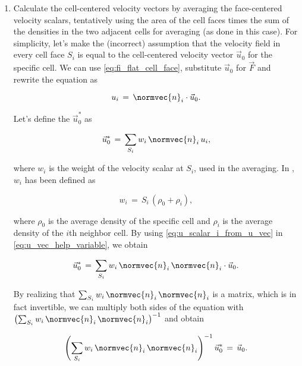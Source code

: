 \begin{enumerate}
    \item Calculate the cell-centered velocity vectors by averaging the face-centered velocity scalars, tentatively using the area of the cell faces times the sum of the densities in the two adjacent cells for averaging (as done in this case). For simplicity, let's make the (incorrect) assumption that the velocity field in every cell face $S_i$ is equal to the cell-centered velocity vector $\vec{u}_0$ for the specific cell. We can use \eqref{eq:fi_flat_cell_face}, substitute $\vec{u}_0$ for $\vec{F}$ and rewrite the equation as
    
    \begin{equation} \label{eq:u_scalar_i_from_u_vec}
    u_i \,=\, \normvec{n}_i\cdot\vec{u}_0.
    \end{equation}
    
    Let's define the  $\vec{u}_0^*$ as
    
    \begin{equation} \label{eq:u_vec_help_variable}
    \vec{u}_0^* \,=\, \sum_{S_i}w_i\,\normvec{n}_i\,u_i,
    \end{equation}
    
    where $w_i$ is the weight of the velocity scalar at $S_i$, used in the averaging. In \thisprojectwork, $w_i$ has been defined as
    
    \begin{equation}
    w_i \,=\, S_i\,(\rho_0 + \rho_i),
    \end{equation}
    
    where $\rho_0$ is the average density of the specific cell and $\rho_i$ is the average density of the $i$th neighbor cell. By using \eqref{eq:u_scalar_i_from_u_vec} in \eqref{eq:u_vec_help_variable}, we obtain
    
    \begin{equation}
    \vec{u}_0^* \,=\, \sum_{S_i}w_i\,\normvec{n}_i\,\normvec{n}_i\cdot\vec{u}_0.
    \end{equation}
    
    By realizing that $\sum_{S_i}w_i\,\normvec{n}_i\,\normvec{n}_i$ is a matrix, which is in fact invertible, we can multiply both sides of the equation with $\left(\sum_{S_i}w_i\,\normvec{n}_i\,\normvec{n}_i\right)^{-1}$ and obtain
    
    \begin{equation}
    \left(\sum_{S_i}w_i\,\normvec{n}_i\,\normvec{n}_i\right)^{-1}\vec{u}_0^* \,=\, \vec{u}_0.
    \end{equation}
    

\end{enumerate}
